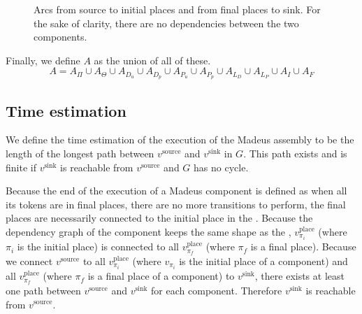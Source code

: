 \begin{figure}[h]
{\begin{minipage}[c]{0.5\columnwidth}
    \end{minipage}
  }
  \caption{Arcs from source to initial places and from final places to sink. For the sake of clarity, there are no dependencies between the two components.}
  \label{fig:source_sink_graph}
\end{figure}

Finally, we define $A$ as the union of all of these. 
\[
A=A_\Pi\cup A_{\Theta}\cup A_{D_{u}}\cup A_{D_{p}}\cup A_{P_{u}}\cup A_{P_{p}}\cup A_{L_{D}}\cup A_{L_{P}}\cup A_{I}\cup A_{F}
\]


\subsection{Time estimation}

We define the time estimation of the execution of the Madeus assembly
to be the length of the longest path between $v^\text{source}$ and
$v^\text{sink}$ in $G$. This path exists and is finite if $v^\text{sink}$ 
is reachable from $v^\text{source}$ and $G$ has no cycle.

Because the end of the execution of a Madeus component is defined as
when all its tokens are in final places, \ie there are no more transitions
to perform, the final places are necessarily connected to the initial place
in the \net. Because the dependency graph of the component keeps the same
shape as the \net, $v_{\pi_i}^\text{place}$ (where $\pi_i$ is the initial
place) is connected to all $v_{\pi_f}^\text{place}$ (where $\pi_f$ is a
final place). Because we connect $v^\text{source}$ to all
$v_{\pi_i}^\text{place}$ (where $v_{\pi_i}$ is the initial place of a
component) and all $v_{\pi_f}^\text{place}$ (where $\pi_f$ is a final place
of a component) to $v^\text{sink}$, there exists at least one path between
$v^\text{source}$ and $v^\text{sink}$ for each component. Therefore
$v^\text{sink}$ is reachable from $v^\text{source}$.


